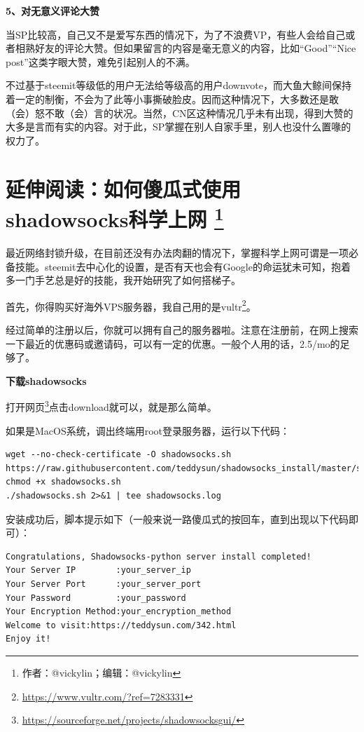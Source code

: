 \documentclass[]{ctexbook}
\renewcommand{\href}[2]{#2\footnote{\url{#1}}}
\begin{document}
\textbf{5、对无意义评论大赞}

当SP比较高，自己又不是爱写东西的情况下，为了不浪费VP，有些人会给自己或者相熟好友的评论大赞。但如果留言的内容是毫无意义的内容，比如``Good''``Nice post''这类字眼大赞，难免引起别人的不满。

不过基于steemit等级低的用户无法给等级高的用户downvote，而大鱼大鲸间保持着一定的制衡，不会为了此等小事撕破脸皮。因而这种情况下，大多数还是敢（会）怒不敢（会）言的状况。当然，CN区这种情况几乎未有出现，得到大赞的大多是言而有实的内容。对于此，SP掌握在别人自家手里，别人也没什么置喙的权力了。

\hypertarget{shadowsocks}{%
\section[延伸阅读：如何傻瓜式使用shadowsocks科学上网 ]{\texorpdfstring{延伸阅读：如何傻瓜式使用shadowsocks科学上网 \footnote{作者：@vickylin；编辑：@vickylin}}{延伸阅读：如何傻瓜式使用shadowsocks科学上网 }}\label{shadowsocks}}

最近网络封锁升级，在目前还没有办法肉翻的情况下，掌握科学上网可谓是一项必备技能。steemit去中心化的设置，是否有天也会有Google的命运犹未可知，抱着多一门手艺总是好的技能，我开始研究了如何搭梯子。

首先，你得购买好海外VPS服务器，我自己用的是\href{https://www.vultr.com/?ref=7283331}{vultr}。

经过简单的注册以后，你就可以拥有自己的服务器啦。注意在注册前，在网上搜索一下最近的优惠码或邀请码，可以有一定的优惠。一般个人用的话，2.5/mo的足够了。

\textbf{下载shadowsocks}

打开\href{https://sourceforge.net/projects/shadowsocksgui/}{网页}点击download就可以，就是那么简单。

如果是MacOS系统，调出终端用root登录服务器，运行以下代码：

\begin{verbatim}
wget --no-check-certificate -O shadowsocks.sh https://raw.githubusercontent.com/teddysun/shadowsocks_install/master/shadowsocks.sh
chmod +x shadowsocks.sh
./shadowsocks.sh 2>&1 | tee shadowsocks.log
\end{verbatim}

安装成功后，脚本提示如下（一般来说一路傻瓜式的按回车，直到出现以下代码即可）：

\begin{verbatim}
Congratulations, Shadowsocks-python server install completed!
Your Server IP        :your_server_ip
Your Server Port      :your_server_port
Your Password         :your_password
Your Encryption Method:your_encryption_method
Welcome to visit:https://teddysun.com/342.html
Enjoy it!
\end{verbatim}
\end{document}
